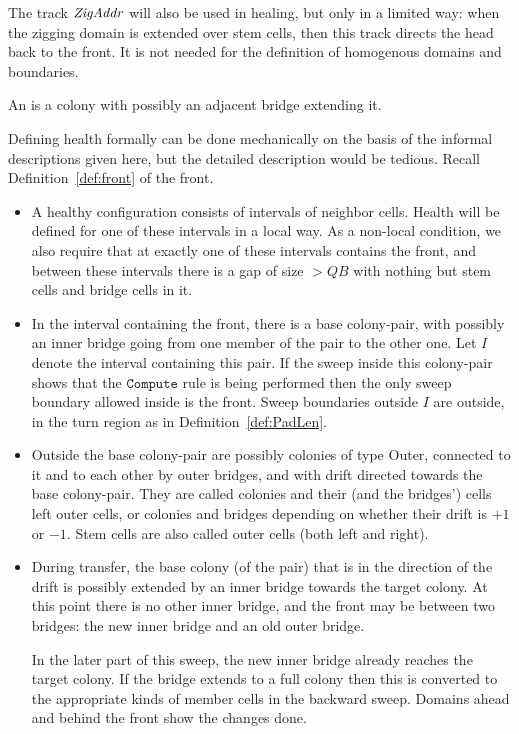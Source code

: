 \documentclass[11pt]{memoir}
\theoremstyle{definition} %
\newcommand{\fld}[1]{\ensuremath{\textit{#1\/}}}
\newcommand{\rul}[1]{\ensuremath{\texttt{#1}}}
\def\B{B}
\newcommand{\Q}{Q} %
\newcommand{\ZigAddr}{\fld{ZigAddr}}
\newcommand{\Outer}{\mathrm{Outer}}
\newcommand{\Compute}{\rul{Compute}}
\begin{document}
\begin{remark}
The track \( \ZigAddr \) will also be used in healing, but only in a limited way: when the zigging domain
is extended over stem cells, then this track directs the head back to the front.
It is not needed for the definition of homogenous domains and boundaries.  
\end{remark}

\begin{definition}\label{def:extended-colony}
  An  is a colony with possibly an adjacent bridge extending it.
\end{definition}

Defining health formally can be done mechanically on the basis of the informal descriptions given here,
but the detailed description would be tedious.
Recall Definition~\ref{def:front} of the front.

\begin{itemize}
\item   A healthy configuration consists of intervals of neighbor cells.
  Health will be defined for one of these intervals in a local way.
  As a non-local condition, we also require that at exactly one of these intervals contains the front, and
  between these intervals there is a gap of size \( >\Q\B \) with nothing but stem cells and
  bridge cells in it.

\item In the interval containing the front,
  there is a base colony-pair, with possibly an inner bridge going from one member of the pair
  to the other one.
  Let \( I \) denote the interval containing this pair.
  If the sweep inside this colony-pair shows that the \( \Compute \) rule is being performed then
  the only sweep boundary allowed inside is the front.
  Sweep boundaries outside \( I \) are outside, in the turn region as in Definition~\ref{def:PadLen}.

\item Outside the base colony-pair are possibly colonies of type \( \Outer \), connected to it and
  to each other by outer bridges, and with drift directed towards the base colony-pair.
  They are called  colonies and their (and the bridges') cells left outer cells, or
   colonies and bridges depending on whether their drift is \( +1 \) or \( -1 \).
  Stem cells are also called outer cells (both left and right).

\item  During transfer, the base colony (of the pair)
  that is in the direction of the drift is possibly extended by an inner bridge towards the target colony.
  At this point there is no other inner bridge,
  and the front may be between two bridges: the new inner bridge and an old outer bridge.
  
  In the later part of this sweep, the new inner bridge already reaches the target colony.
  If the bridge extends to a full colony then this is converted to the appropriate kinds of member
  cells in the backward sweep.
  Domains ahead and behind the front show the changes done.
  
\end{itemize}
\end{document}
